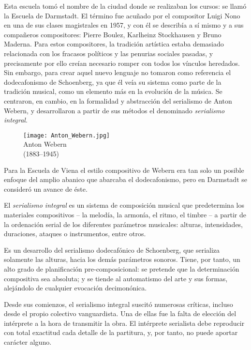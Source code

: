 	Esta escuela tomó el nombre de la ciudad donde se realizaban los cursos: se llamó la Escuela de Darmstadt. El término fue acuñado por el compositor Luigi Nono en una de sus clases magistrales en 1957, y con él se describía a sí mismo y a sus compañeros compositores: Pierre Boulez, Karlheinz Stockhausen y Bruno Maderna. Para estos compositores, la tradición artística estaba demasiado relacionada con los fracasos políticos y las penurias sociales pasadas, y precisamente por ello creían necesario romper con todos los vínculos heredados.
    Sin embargo, para crear aquel nuevo lenguaje no tomaron como referencia el dodecafonismo de Schoenberg, ya que él veía su sistema como parte de la tradición musical, como un elemento más en la evolución de la música. Se centraron, en cambio, en la formalidad y abstracción del serialismo de Anton Webern, y desarrollaron a partir de sus métodos el denominado \emph{serialismo integral}.
    
    \begin{figure}[h]
    	\begin{center}
    		\texttt{[image: Anton\_Webern.jpg]}\\	
    		{Anton Webern\\(1883--1945)}
    	\end{center}
    \end{figure}
    
    Para la Escuela de Viena el estilo compositivo de Webern era tan solo un posible enfoque del amplio abanico que abarcaba el dodecafonismo, pero en Darmstadt se consideró un avance de éste.
	
	El \emph{serialismo integral} es un sistema de composición musical que predetermina los materiales compositivos -- la melodía, la armonía, el ritmo, el timbre -- a partir de la ordenación serial de los diferentes parámetros musicales: alturas, intensidades, duraciones, ataques o instrumentos, entre otros. 
	
	Es un desarrollo del serialismo dodecafónico de Schoenberg, que serializa solamente las alturas, hacia los demás parámetros sonoros. Tiene, por tanto, un alto grado de planificación pre-composicional: se pretende que la determinación compositiva sea absoluta; y se tiende al automatismo del arte y sus formas, alejándolo de cualquier evocación decimonónica.

	Desde sus comienzos, el serialismo integral suscitó numerosas críticas, incluso desde el propio colectivo vanguardista. Una de ellas fue la falta de elección del intérprete a la hora de transmitir la obra. El intérprete serialista debe reproducir con total exactitud cada detalle de la partitura, y, por tanto, no puede aportar carácter alguno. 
	
